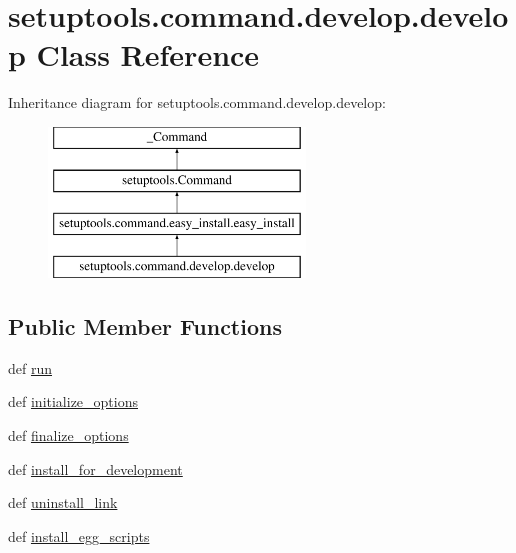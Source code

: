 \hypertarget{classsetuptools_1_1command_1_1develop_1_1develop}{}\section{setuptools.\+command.\+develop.\+develop Class Reference}
\label{classsetuptools_1_1command_1_1develop_1_1develop}
Inheritance diagram for setuptools.\+command.\+develop.\+develop\+:\begin{figure}[H]
\begin{center}
\leavevmode
\includegraphics[height=4.000000cm]{classsetuptools_1_1command_1_1develop_1_1develop}
\end{center}
\end{figure}
\subsection*{Public Member Functions}
\begin{DoxyCompactItemize}
\item 
def \hyperlink{classsetuptools_1_1command_1_1develop_1_1develop_a8aa5cf787b00367c6e7171941a68d51f}{run}
\item 
def \hyperlink{classsetuptools_1_1command_1_1develop_1_1develop_af7d956f1990c6c16001a84f93483ca35}{initialize\+\_\+options}
\item 
def \hyperlink{classsetuptools_1_1command_1_1develop_1_1develop_acd6d60ea9b2ff8130bac159c7570f602}{finalize\+\_\+options}
\item 
def \hyperlink{classsetuptools_1_1command_1_1develop_1_1develop_a0cec31a02bbbd3022caffe9d47f1f248}{install\+\_\+for\+\_\+development}
\item 
def \hyperlink{classsetuptools_1_1command_1_1develop_1_1develop_a0f96a4a72b53c819d5e78f78b28671f8}{uninstall\+\_\+link}
\item 
def \hyperlink{classsetuptools_1_1command_1_1develop_1_1develop_ae0497012d9be741537b4907ae5912b47}{install\+\_\+egg\+\_\+scripts}
\end{DoxyCompactItemize}
